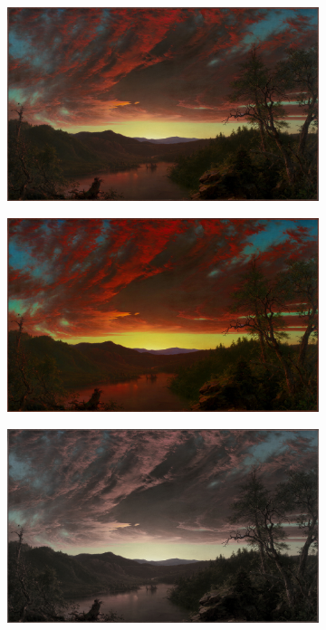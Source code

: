 \begin{figure}[!h]
    \centering
    \begin{subfigure}[b]{0.3\textwidth}
        \includegraphics[width=1\textwidth]{report_src/effects/original1.jpeg}
    \end{subfigure}
    \begin{subfigure}[b]{0.3\textwidth}
        \includegraphics[width=1\textwidth]{report_src/effects/saturation_high.jpeg}
    \end{subfigure}
    \begin{subfigure}[b]{0.3\textwidth}
        \includegraphics[width=1\textwidth]{report_src/effects/saturation_low.jpeg}
    \end{subfigure}
\end{figure} 

